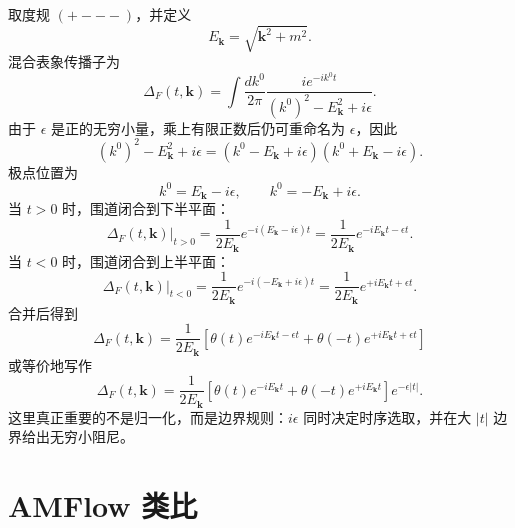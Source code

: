 \documentclass[a4paper,11pt]{article}
\begin{document}
取度规 $(+---)$，并定义
\begin{equation}
    E_{\mathbf{k}}=\sqrt{\mathbf{k}^2+m^2}.
\end{equation}
混合表象传播子为
\begin{equation}
    \Delta_F(t,\mathbf{k})
    =
    \int\frac{dk^0}{2\pi}
    \frac{i e^{-ik^0 t}}
    {(k^0)^2-E_{\mathbf{k}}^2+i\epsilon}.
\end{equation}
由于 $\epsilon$ 是正的无穷小量，乘上有限正数后仍可重命名为 $\epsilon$，因此
\begin{equation}
    (k^0)^2-E_{\mathbf{k}}^2+i\epsilon
    =
    (k^0-E_{\mathbf{k}}+i\epsilon)
    (k^0+E_{\mathbf{k}}-i\epsilon).
\end{equation}
极点位置为
\begin{equation}
    k^0=E_{\mathbf{k}}-i\epsilon,
    \qquad
    k^0=-E_{\mathbf{k}}+i\epsilon .
\end{equation}
当 $t>0$ 时，围道闭合到下半平面：
\begin{equation}
    \Delta_F(t,\mathbf{k})\big|_{t>0}
    =
    \frac{1}{2E_{\mathbf{k}}}
    e^{-i(E_{\mathbf{k}}-i\epsilon)t}
    =
    \frac{1}{2E_{\mathbf{k}}}
    e^{-iE_{\mathbf{k}}t-\epsilon t}.
\end{equation}
当 $t<0$ 时，围道闭合到上半平面：
\begin{equation}
    \Delta_F(t,\mathbf{k})\big|_{t<0}
    =
    \frac{1}{2E_{\mathbf{k}}}
    e^{-i(-E_{\mathbf{k}}+i\epsilon)t}
    =
    \frac{1}{2E_{\mathbf{k}}}
    e^{+iE_{\mathbf{k}}t+\epsilon t}.
\end{equation}
合并后得到
\begin{equation}
    \boxed{
    \Delta_F(t,\mathbf{k})
    =
    \frac{1}{2E_{\mathbf{k}}}
    \left[
        \theta(t)e^{-iE_{\mathbf{k}}t-\epsilon t}
        +
        \theta(-t)e^{+iE_{\mathbf{k}}t+\epsilon t}
    \right]}
\end{equation}
或等价地写作
\begin{equation}
    \boxed{
    \Delta_F(t,\mathbf{k})
    =
    \frac{1}{2E_{\mathbf{k}}}
    \left[
        \theta(t)e^{-iE_{\mathbf{k}}t}
        +
        \theta(-t)e^{+iE_{\mathbf{k}}t}
    \right]e^{-\epsilon |t|}} .
\end{equation}
这里真正重要的不是归一化，而是边界规则：$i\epsilon$ 同时决定时序选取，并在大 $|t|$ 边界给出无穷小阻尼。

\section{AMFlow 类比}
\end{document}
